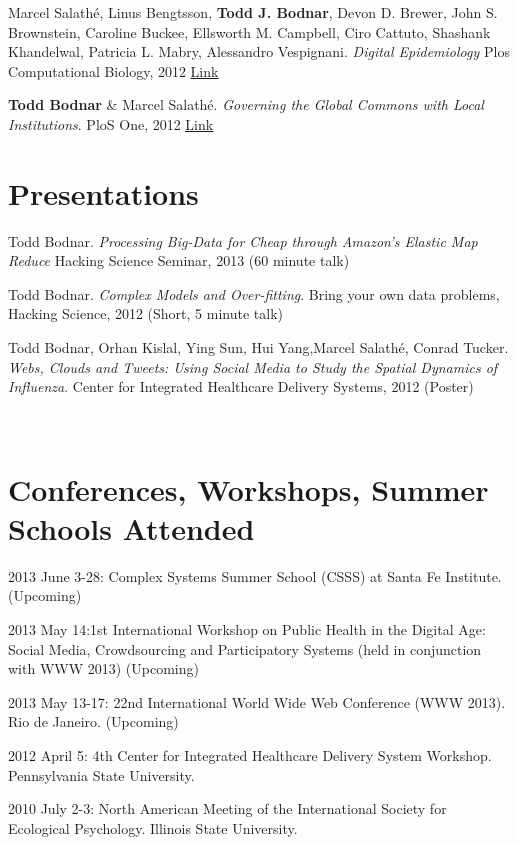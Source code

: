 \documentclass[margin,line]{res}
\newcommand{\linkToUrl}[1]{\underline{\color{blue} \href{#1}{Link}}}
\begin{document}
\begin{resume}
\begin{etaremune}[start=3]
\item Marcel Salath\'e, Linus Bengtsson, \textbf{Todd J. Bodnar}, Devon D. Brewer, John S. Brownstein, Caroline Buckee, Ellsworth M. Campbell, Ciro Cattuto, Shashank Khandelwal, Patricia L. Mabry,  Alessandro Vespignani. \textit{Digital Epidemiology} Plos Computational Biology, 2012 \linkToUrl{http://bitly.com/PO2fSx}

\item \textbf{Todd Bodnar} \& Marcel Salath\'e. \textit{Governing the Global Commons with Local Institutions}. PloS One, 2012 \linkToUrl{http://bit.ly/TtsZd5}
\end{etaremune}

\section{\sc Presentations}
\begin{etaremune}[start=3]
\item Todd Bodnar. \textit{Processing Big-Data for Cheap through Amazon's Elastic Map Reduce} Hacking Science Seminar, 2013 (60 minute talk) 
\item Todd Bodnar. \textit{Complex Models and Over-fitting}. Bring your own data problems, Hacking Science, 2012 (Short, 5 minute talk)
\item Todd Bodnar, Orhan Kislal, Ying Sun, Hui Yang,Marcel Salath\'e, Conrad 
Tucker. \textit{Webs, Clouds and Tweets: Using Social Media to Study the Spatial Dynamics of Influenza}. Center for Integrated Healthcare Delivery Systems, 2012 (Poster)
\end{etaremune}

\ 

\section{\sc Conferences, Workshops, Summer Schools Attended}
\begin{etaremune}[start=5]
\item 2013 June 3-28: Complex Systems Summer School (CSSS) at Santa Fe Institute. (Upcoming)
\item 2013 May 14:1st International Workshop on Public Health in the Digital Age: Social Media, Crowdsourcing and Participatory Systems (held in conjunction with WWW 2013) (Upcoming)
\item 2013 May 13-17: 22nd International World Wide Web Conference (WWW 2013). Rio de Janeiro. (Upcoming)
\item 2012 April 5: 4th Center for Integrated Healthcare Delivery System Workshop. Pennsylvania State University.
\item 2010 July 2-3: North American Meeting of the International Society for Ecological Psychology. Illinois State University.
\end{etaremune}



\end{resume}
\end{document}
